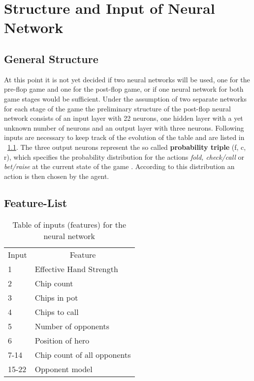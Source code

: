 \chapter{Structure and Input of Neural Network}
\section{General Structure}
At this point it is not yet decided if two neural networks will be used, one for the pre-flop game and one for the post-flop game, or if one neural network for both game stages would be sufficient. Under the assumption of two separate networks for each stage of the game the preliminary structure of the post-flop neural network consists of an input layer with 22 neurons,  one hidden layer with a yet unknown number of neurons and an output layer with three neurons. Following inputs are necessary to keep track of the evolution of the table and are listed in ~\ref{feature_tab}. The three output neurons represent the so called \textbf{probability triple} (f, c, r), which specifies the probability distribution for the actions \textit{fold, check/call} or \textit{bet/raise} at the current state of the game \cite{review}. According to this distribution an action is then chosen by the agent.

\section{Feature-List}
\begin{table}[]
\begin{tabular}{|l||l|}
\hline
\multicolumn{1}{|c||}{Input} & \multicolumn{1}{c|}{Feature} \\ \hhline{=#=}
1                           & Effective Hand Strength      \\ \hline
2                           & Chip count                   \\ \hline
3                           & Chips in pot                 \\ \hline
4                           & Chips to call                \\ \hline
5                           & Number of opponents          \\ \hline
6                           & Position of hero             \\ \hline
7-14                        & Chip count of all opponents  \\ \hline
15-22                       & Opponent model               \\ \hline
\end{tabular}
\centering
\caption{Table of inputs (features) for the neural network}
\label{feature_tab}
\end{table}
